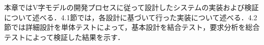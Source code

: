
本章ではV字モデルの開発プロセスに従って設計したシステムの実装および検証について述べる．4.1節では，各設計に基づいて行った実装について述べる．4.2節では詳細設計を単体テストによって，基本設計を結合テスト，要求分析を総合テストによって検証した結果を示す．